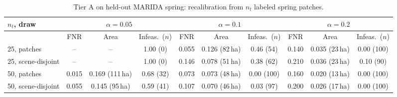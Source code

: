 \begin{table}[t]
\centering
\footnotesize
\setlength{\tabcolsep}{3pt}
\begin{tabular}{lccccccccc}
\toprule
$n_t$, draw & \multicolumn{3}{c}{$\alpha=0.05$} & \multicolumn{3}{c}{$\alpha=0.1$} & \multicolumn{3}{c}{$\alpha=0.2$} \\
\midrule
 & FNR & Area & Infeas.\ ($n$) & FNR & Area & Infeas.\ ($n$) & FNR & Area & Infeas.\ ($n$) \\
\midrule
25, patches & -- & -- & 1.00 (0) & 0.055 & 0.126 (82\,ha) & 0.46 (54) & 0.140 & 0.035 (23\,ha) & 0.00 (100) \\
25, scene-disjoint & -- & -- & 1.00 (0) & 0.146 & 0.078 (51\,ha) & 0.38 (62) & 0.210 & 0.036 (23\,ha) & 0.10 (90) \\
50, patches & 0.015 & 0.169 (111\,ha) & 0.68 (32) & 0.073 & 0.073 (48\,ha) & 0.00 (100) & 0.160 & 0.020 (13\,ha) & 0.00 (100) \\
50, scene-disjoint & 0.055 & 0.145 (95\,ha) & 0.59 (41) & 0.107 & 0.070 (46\,ha) & 0.03 (97) & 0.200 & 0.026 (17\,ha) & 0.00 (100) \\
\bottomrule
\end{tabular}
\caption{Tier A on held-out MARIDA spring: recalibration from $n_t$ labeled spring patches.}
\label{tab:marida_tier_a}
\end{table}

